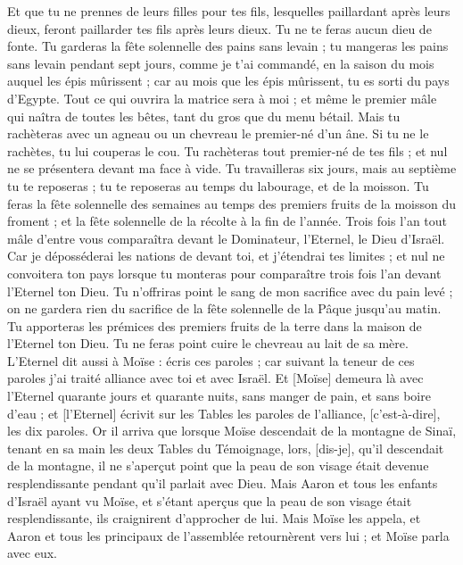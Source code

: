 \begin{multicols}{2}
Et que tu ne prennes de leurs filles pour tes fils, lesquelles paillardant après leurs dieux, feront paillarder tes fils après leurs dieux.
Tu ne te feras aucun dieu de fonte.
Tu garderas la fête solennelle des pains sans levain ; tu mangeras les pains sans levain pendant sept jours, comme je t'ai commandé, en la saison du mois auquel les épis mûrissent ; car au mois que les épis mûrissent, tu es sorti du pays d'Egypte.
Tout ce qui ouvrira la matrice sera à moi ; et même le premier mâle qui naîtra de toutes les bêtes, tant du gros que du menu bétail.
Mais tu rachèteras avec un agneau ou un chevreau le premier-né d'un âne. Si tu ne le rachètes, tu lui couperas le cou. Tu rachèteras tout premier-né de tes fils ; et nul ne se présentera devant ma face à vide.
Tu travailleras six jours, mais au septième tu te reposeras ; tu te reposeras au temps du labourage, et de la moisson.
Tu feras la fête solennelle des semaines au temps des premiers fruits de la moisson du froment ; et la fête solennelle de la récolte à la fin de l'année.
Trois fois l'an tout mâle d'entre vous comparaîtra devant le Dominateur, l'Eternel, le Dieu d'Israël.
Car je déposséderai les nations de devant toi, et j'étendrai tes limites ; et nul ne convoitera ton pays lorsque tu monteras pour comparaître trois fois l'an devant l'Eternel ton Dieu.
Tu n'offriras point le sang de mon sacrifice avec du pain levé ; on ne gardera rien du sacrifice de la fête solennelle de la Pâque jusqu’au matin.
Tu apporteras les prémices des premiers fruits de la terre dans la maison de l'Eternel ton Dieu. Tu ne feras point cuire le chevreau au lait de sa mère.
L'Eternel dit aussi à Moïse : écris ces paroles ; car suivant la teneur de ces paroles j'ai traité alliance avec toi et avec Israël.
Et [Moïse] demeura là avec l'Eternel quarante jours et quarante nuits, sans manger de pain, et sans boire d'eau ; et [l'Eternel] écrivit sur les Tables les paroles de l'alliance, [c'est-à-dire], les dix paroles.
Or il arriva que lorsque Moïse descendait de la montagne de Sinaï, tenant en sa main les deux Tables du Témoignage, lors, [dis-je], qu'il descendait de la montagne, il ne s'aperçut point que la peau de son visage était devenue resplendissante pendant qu'il parlait avec Dieu.
Mais Aaron et tous les enfants d'Israël ayant vu Moïse, et s'étant aperçus que la peau de son visage était resplendissante, ils craignirent d'approcher de lui.
Mais Moïse les appela, et Aaron et tous les principaux de l'assemblée retournèrent vers lui ; et Moïse parla avec eux.

\end{multicols}
